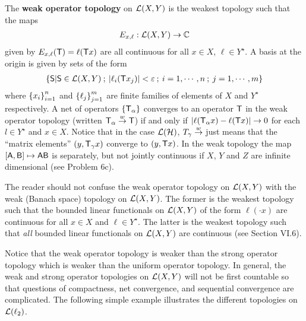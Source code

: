 The \textbf{weak operator topology} on $\mathcal L(X,Y)$ is the weakest topology such that the maps
\begin{align}
    E_{x, \ell} : \mathcal L(X,Y) \to \mathbb{C} 
\end{align}
given by $E_{x, \ell}(\mathsf{T}) = \ell(\mathsf{T} x)$ are all continuous for all $x \in X$, $\ell \in Y^\star$. A basis at the origin is given by sets of the form \begin{align}
    \left \lbrace \mathsf{S} | \mathsf{S} \in \mathcal L(X,Y) \:; \: |\ell_i(\mathsf{T} x_j)| < \varepsilon \:; \: i = 1, \cdots , n \:; \: j = 1, \cdots, m \right \rbrace 
\end{align}
where $\left \lbrace x_i \right \rbrace_{i=1}^n$ and $\left \lbrace \ell_j \right \rbrace_{j=1}^m$ are finite families of elements of $X$ and $Y^\star$ respectively. A net of operators $\left \lbrace \mathsf{T}_\alpha \right \rbrace$ converges to an operator $\mathsf{T}$ in the weak operator topology (written $\mathsf{T}_\alpha \overset{w}\rightarrow \mathsf{T}$) if and only if $|\ell (\mathsf{T}_\alpha x) - \ell (\mathsf{T} x)| \rightarrow 0$ for each $l \in Y^\star$ and $x \in X$. Notice that in the case $\mathcal L(\mathcal{H})$, $T_\gamma \overset{w}\rightarrow$ just means that the \enquote{matrix elements} $(y, \mathsf{T}_\gamma x)$ converge to $(y, \mathsf{T} x)$. In the weak topology the map $[\mathsf{A}, \mathsf{B}] \mapsto \mathsf{A} \mathsf{B}$ is separately, but not jointly continuous if $X$, $Y$ and $Z$ are infinite dimensional (see Problem 6c).

\begin{remark}
    The reader should not confuse the weak operator topology on $\mathcal L(X,Y)$ with the weak (Banach space) topology on $\mathcal L(X,Y)$. The former is the weakest topology such that the bounded linear functionals on $\mathcal L(X,Y)$ of the form $\ell(\cdot x)$ are continuous for all $x \in X$ and $\ell \in Y^\star$. The latter is the weakest topology such that \textit{all} bounded linear functionals on $\mathcal L(X,Y)$ are continuous (see Section VI.6).
\end{remark}

Notice that the weak operator topology is weaker than the strong operator topology which is weaker than the uniform operator topology. In general, the weak and strong operator topologies on $\mathcal L(X,Y)$ will not be first countable so that questions of compactness, net convergence, and sequential convergence are complicated. The following simple example illustrates the different topologies on $\mathcal L(\ell_2)$.


